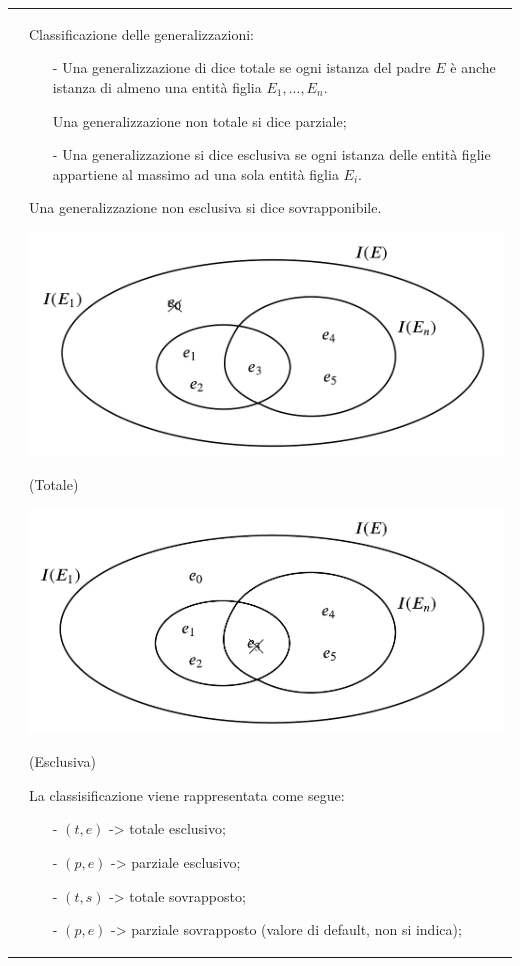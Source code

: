 \documentclass[a4paper, 10pt]{report}
\begin{document}
\begin{longtable}{| p{} | p{} |}
 & Classificazione delle generalizzazioni:
\begin{itemize}
\item[-] Una generalizzazione di dice totale se ogni istanza del padre $E$ è anche istanza di almeno una entità figlia $E_1,...,E_n$.

Una generalizzazione non totale si dice parziale;
\item[-] Una generalizzazione si dice esclusiva se ogni istanza delle entità figlie appartiene al massimo ad una sola entità figlia $E_i$.
\end{itemize}

Una generalizzazione non esclusiva si dice sovrapponibile.
 
\begin{center}
\includegraphics[scale=0.35]{21ottobre04.pdf}

(Totale)

\includegraphics[scale=0.35]{21ottobre05.pdf}

(Esclusiva)
\end{center}

La classisificazione viene rappresentata come segue:



\begin{itemize}
\item[-] $(t, e)$ -> totale esclusivo;
\item[-] $(p, e)$ -> parziale esclusivo;
\item[-] $(t, s)$ -> totale sovrapposto;
\item[-] $(p, e)$ -> parziale sovrapposto (valore di default, non si indica);
\end{itemize}


\end{longtable}
\end{document}
